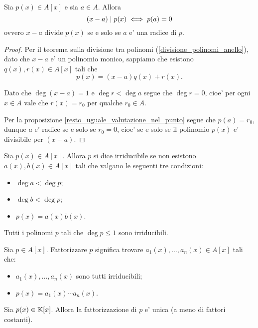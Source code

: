 \begin{theorem}
    [di Ruffini] \label{th_Ruffini}
    Sia $p(x) \in A[x]$ e sia $a \in A$. Allora \[
        (x - a) \mid p(x) \iff p(a) = 0    
    \] ovvero $x - a$ divide $p(x)$ se e solo se $a$ e' una radice di $p$.
\end{theorem}
\begin{proof}
    Per il teorema sulla divisione tra polinomi (\ref{divisione_polinomi_anello}), dato che $x-a$ e' un polinomio monico, sappiamo che esistono $q(x), r(x) \in A[x]$ tali che \[
        p(x) = (x-a)q(x) + r(x).
    \]

    Dato che $\deg (x - a) = 1$ e $\deg r < \deg a$ segue che $\deg r = 0$, cioe' per ogni $x \in A$ vale che $r(x) = r_0$ per qualche $r_0 \in A$.

    Per la proposizione \ref{resto_uguale_valutazione_nel_punto} segue che $p(a) = r_0$, dunque $a$ e' radice se e solo se $r_0 = 0$, cioe' se e solo se il polinomio $p(x)$ e' divisibile per $(x - a)$.
\end{proof}

\begin{definition}[Irriducibile]
    Sia $p(x) \in A[x]$. Allora $p$ si dice irriducibile se non esistono $a(x), b(x) \in A[x]$ tali che valgano le seguenti tre condizioni: \begin{itemize}
        \item $\deg a < \deg p$;
        \item $\deg b < \deg p$;
        \item $p(x) = a(x)b(x)$.
    \end{itemize}
\end{definition}

\begin{remark}
    Tutti i polinomi $p$ tali che $\deg p \leq 1$ sono irriducibili.
\end{remark}

\begin{definition}
    Sia $p \in A[x]$. Fattorizzare $p$ significa trovare $a_1(x), \dots, a_n(x) \in A[x]$ tali che: \begin{itemize}
        \item $a_1(x), \dots, a_n(x)$ sono tutti irriducibili;
        \item $p(x) = a_1(x) \cdots a_n(x)$.
    \end{itemize}
\end{definition}

\begin{proposition}
    Sia $p(x) \in \mathbb{K}[x]$. Allora la fattorizzazione di $p$ e' unica (a meno di fattori costanti).
\end{proposition}

